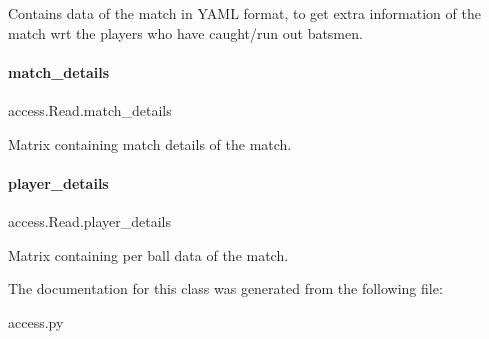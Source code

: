 Contains data of the match in Y\+A\+ML format, to get extra information of the match wrt the players who have caught/run out batsmen. 

\mbox{\label{classaccess_1_1Read_afb6b007e7b4888e71b0aedc00e92708d}} 
\paragraph{\texorpdfstring{match\+\_\+details}{match\_details}}
{\footnotesize\ttfamily access.\+Read.\+match\+\_\+details}



Matrix containing match details of the match. 

\mbox{\label{classaccess_1_1Read_a4682ffb3f43ec732d63d89d8ee78cc1a}} 
\paragraph{\texorpdfstring{player\+\_\+details}{player\_details}}
{\footnotesize\ttfamily access.\+Read.\+player\+\_\+details}



Matrix containing per ball data of the match. 



The documentation for this class was generated from the following file\+:\begin{DoxyCompactItemize}
\item 
access.\+py\end{DoxyCompactItemize}
